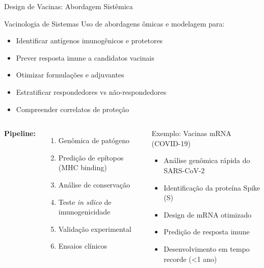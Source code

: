 \begin{frame}{Design de Vacinas: Abordagem Sistêmica}
\begin{block}{Vacinologia de Sistemas}
Uso de abordagens ômicas e modelagem para:
\begin{itemize}
    \item Identificar antígenos imunogênicos e protetores
    \item Prever resposta imune a candidatos vacinais
    \item Otimizar formulações e adjuvantes
    \item Estratificar respondedores vs não-respondedores
    \item Compreender correlatos de proteção
\end{itemize}
\end{block}

\vspace{0.3cm}

\begin{columns}
\textbf{Pipeline:}
\begin{enumerate}
    \item Genômica de patógeno
    \item Predição de epítopos (MHC binding)
    \item Análise de conservação
    \item Teste \textit{in silico} de imunogenicidade
    \item Validação experimental
    \item Ensaios clínicos
\end{enumerate}

\begin{exampleblock}{Exemplo: Vacinas mRNA (COVID-19)}
\begin{itemize}
    \item Análise genômica rápida do SARS-CoV-2
    \item Identificação da proteína Spike (S)
    \item Design de mRNA otimizado
    \item Predição de resposta imune
    \item Desenvolvimento em tempo recorde (<1 ano)
\end{itemize}
\end{exampleblock}
\end{columns}

\end{frame}


